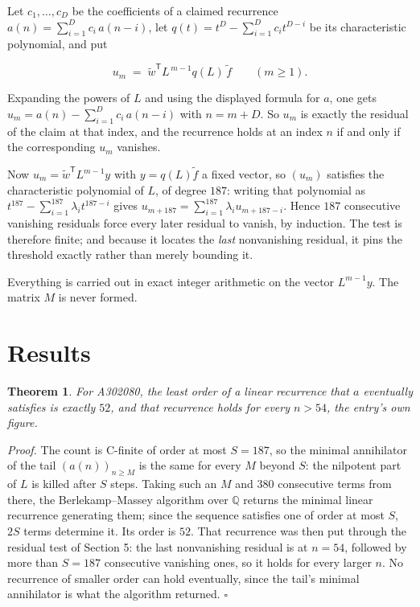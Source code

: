 \documentclass[11pt]{article}
\newtheorem{theorem}{Theorem}
\theoremstyle{definition}
\begin{document}
Let $c_1,\dots,c_D$ be the coefficients of a claimed recurrence $a(n) = \sum_{i=1}^{D} c_i\,a(n-i)$, let $q(t) = t^{D} - \sum_{i=1}^{D} c_i t^{D-i}$ be its characteristic polynomial, and put

\[u_m \;=\; \tilde w^{\mathsf T} L^{\,m-1} q(L)\,\tilde f \qquad (m \ge 1).\]

Expanding the powers of $L$ and using the displayed formula for $a$, one gets $u_m = a(n) - \sum_{i=1}^{D} c_i\,a(n-i)$ with $n = m + D$. So $u_m$ is exactly the residual of the claim at that index, and the recurrence holds at an index $n$ if and only if the corresponding $u_m$ vanishes.

Now $u_m = \tilde w^{\mathsf T} L^{m-1} y$ with $y = q(L)\tilde f$ a fixed vector, so $(u_m)$ satisfies the characteristic polynomial of $L$, of degree $187$: writing that polynomial as $t^{187} - \sum_{i=1}^{187} \lambda_i t^{187-i}$ gives $u_{m+187} = \sum_{i=1}^{187} \lambda_i u_{m+187-i}$. Hence $187$ consecutive vanishing residuals force every later residual to vanish, by induction. The test is therefore finite; and because it locates the {\itshape last} nonvanishing residual, it pins the threshold exactly rather than merely bounding it.

Everything is carried out in exact integer arithmetic on the vector $L^{m-1}y$. The matrix $M$ is never formed.

\section{Results}

\begin{theorem} For A302080, the least order of a linear recurrence that $a$ eventually satisfies is exactly $52$, and that recurrence holds for every $n > 54$, the entry's own figure.\end{theorem}

{\itshape Proof.} The count is C-finite of order at most $S = 187$, so the minimal annihilator of the tail $(a(n))_{n \ge M}$ is the same for every $M$ beyond $S$: the nilpotent part of $L$ is killed after $S$ steps. Taking such an $M$ and $380$ consecutive terms from there, the Berlekamp--Massey algorithm over $\mathbb{Q}$ returns the minimal linear recurrence generating them; since the sequence satisfies one of order at most $S$, $2S$ terms determine it. Its order is $52$. That recurrence was then put through the residual test of Section 5: the last nonvanishing residual is at $n = 54$, followed by more than $S = 187$ consecutive vanishing ones, so it holds for every larger $n$. No recurrence of smaller order can hold eventually, since the tail's minimal annihilator is what the algorithm returned. $\square$
\end{document}
